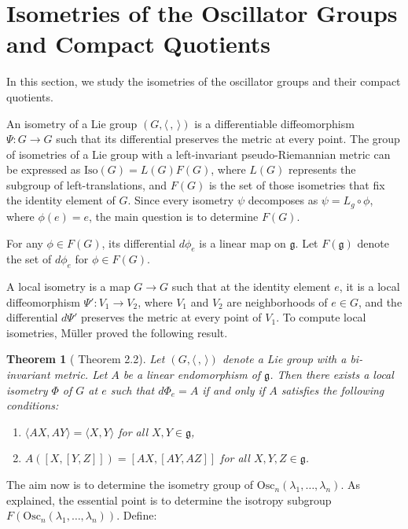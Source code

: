 \documentclass[12pt]{amsart}
\theoremstyle{plain}
\newtheorem{thm}{Theorem}[section]
\theoremstyle{definition}
\theoremstyle{remark}
\begin{document}
	
	
	
	
\section{Isometries of the Oscillator Groups and Compact Quotients}
In this section, we study the isometries of the oscillator groups and their compact quotients.

An isometry of a Lie group \( (G, \langle \,,\, \rangle) \) is a differentiable diffeomorphism \( \Psi: G \to G \) such that its differential preserves the metric at every point. The group of isometries of a Lie group with a left-invariant pseudo-Riemannian metric can be expressed as \( \text{Iso}(G) = L(G)F(G) \), where \( L(G) \) represents the subgroup of left-translations, and \( F(G) \) is the set of those isometries that fix the identity element of \( G \). Since every isometry \( \psi \) decomposes as \( \psi = L_g \circ \phi \), where \( \phi(e) = e \), the main question is to determine \( F(G) \).

For any \( \phi \in F(G) \), its differential \( d\phi_e \) is a linear map on \( \mathfrak{g} \). Let \( F(\mathfrak{g}) \) denote the set of \( d\phi_e \) for \( \phi \in F(G) \).

A local isometry is a map \( G \to G \) such that at the identity element \( e \), it is a local diffeomorphism \( \Psi': V_1 \to V_2 \), where \( V_1 \) and \( V_2 \) are neighborhoods of \( e \in G \), and the differential \( d\Psi' \) preserves the metric at every point of \( V_1 \). To compute local isometries, Müller proved the following result.

\begin{thm}[\cite{MU} Theorem 2.2] 
    Let \( (G, \langle \,,\, \rangle) \) denote a Lie group with a bi-invariant metric. Let \( A \) be a linear endomorphism of \( \mathfrak{g} \). Then there exists a local isometry \( \Phi \) of \( G \) at \( e \) such that \( d\Phi_e = A \) if and only if \( A \) satisfies the following conditions:
    \begin{enumerate}
        \item \( \langle AX, AY \rangle = \langle X, Y \rangle \) for all \( X, Y \in \mathfrak{g} \),
        \item \( A([X,[Y,Z]]) = [AX,[AY,AZ]] \) for all \( X, Y, Z \in \mathfrak{g} \).
    \end{enumerate}
\end{thm}

The aim now is to determine the isometry group of \( \text{Osc}_n(\lambda_1, \ldots, \lambda_n) \). As explained, the essential point is to determine the isotropy subgroup \( F(\text{Osc}_n(\lambda_1, \ldots, \lambda_n)) \). Define:
\end{document}
